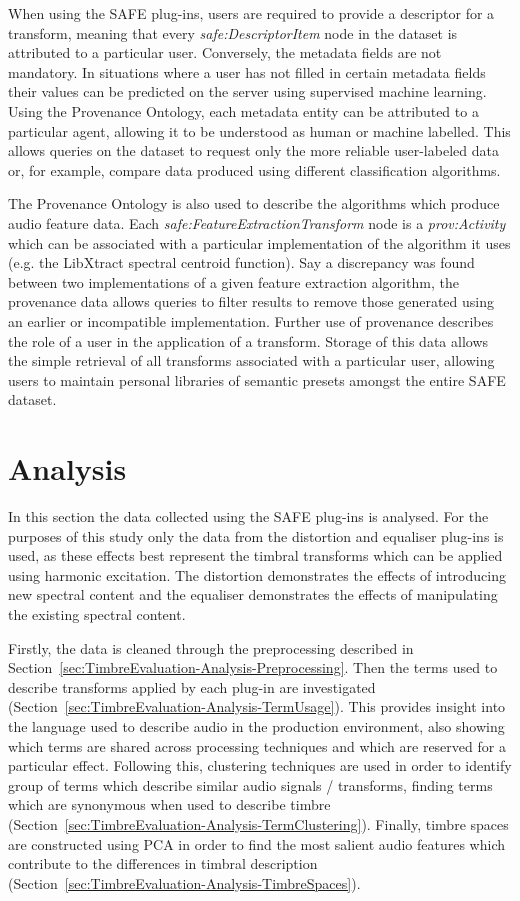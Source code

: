 		When using the SAFE plug-ins, users are required to provide a descriptor for a transform, meaning that
		every \emph{safe:DescriptorItem} node in the dataset is attributed to a particular user. Conversely, the
		metadata fields are not mandatory. In situations where a user has not filled in certain metadata fields
		their values can be predicted on the server using supervised machine learning. Using the Provenance
		Ontology, each metadata entity can be attributed to a particular agent, allowing it to be understood as
		human or machine labelled. This allows queries on the dataset to request only the more reliable
		user-labeled data or, for example, compare data produced using different classification algorithms.

		The Provenance Ontology is also used to describe the algorithms which produce audio feature data. Each
		\emph{safe:FeatureExtractionTransform} node is a \emph{prov:Activity} which can be associated with a
		particular implementation of the algorithm it uses (e.g. the LibXtract \citep{bullock2007libxtract}
		spectral centroid function). Say a discrepancy was found between two implementations of a given feature
		extraction algorithm, the provenance data allows queries to filter results to remove those generated using
		an earlier or incompatible implementation. Further use of provenance describes the role of a user in the
		application of a transform. Storage of this data allows the simple retrieval of all transforms associated
		with a particular user, allowing users to maintain personal libraries of semantic presets amongst the
		entire SAFE dataset.

\section{Analysis}
\label{sec:TimbreEvaluation-Analysis}
	In this section the data collected using the SAFE plug-ins is analysed. For the purposes of this study only the
	data from the distortion and equaliser plug-ins is used, as these effects best represent the timbral transforms
	which can be applied using harmonic excitation. The distortion demonstrates the effects of introducing new spectral
	content and the equaliser demonstrates the effects of manipulating the existing spectral content.

	Firstly, the data is cleaned through the preprocessing described in
	Section~\ref{sec:TimbreEvaluation-Analysis-Preprocessing}. Then the terms used to describe transforms applied by
	each plug-in are investigated (Section~\ref{sec:TimbreEvaluation-Analysis-TermUsage}). This provides insight into
	the language used to describe audio in the production environment, also showing which terms are shared across
	processing techniques and which are reserved for a particular effect. Following this, clustering techniques are
	used in order to identify group of terms which describe similar audio signals / transforms, finding terms which are
	synonymous when used to describe timbre (Section~\ref{sec:TimbreEvaluation-Analysis-TermClustering}). Finally,
	timbre spaces are constructed using PCA in order to find the most salient audio features which contribute to the
	differences in timbral description (Section~\ref{sec:TimbreEvaluation-Analysis-TimbreSpaces}).

